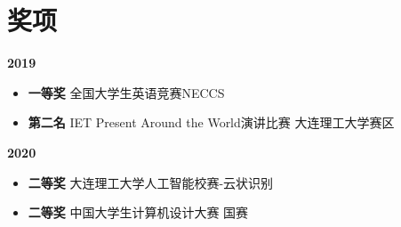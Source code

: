\documentclass[a4,12pt]{article}
\newcommand{\subtext}[1]{
#1\par\vspace{-0.3cm}}
\newenvironment{zitemize}{
\begin{itemize}\itemsep0pt \parskip0pt \parsep1pt}
{\end{itemize}\vspace{-0.5cm}}
\begin{document}



\section{\textbf{奖项}}
\vspace{-0.2cm}
\subtext{\textbf{2019}}
\begin{zitemize}
    \item \textbf{一等奖} 全国大学生英语竞赛NECCS
    \item \textbf{第二名} IET Present Around the World演讲比赛 大连理工大学赛区
\end{zitemize}

\vspace{0.3cm}
\subtext{\textbf{2020}}
\begin{zitemize}
    \item \textbf{二等奖} 大连理工大学人工智能校赛-云状识别
    \item \textbf{二等奖} 中国大学生计算机设计大赛 国赛
\end{zitemize}


\end{document}
